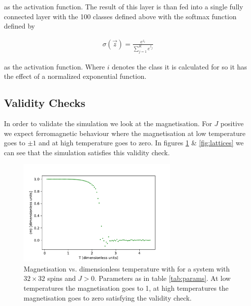 \documentclass[10 pt, a4paper]{article}
\begin{document}
as the activation function. The result of this layer is than fed into a single fully connected layer with the 100 classes defined above with the softmax function defined by

\begin{align}
\sigma(\vec{z}) = \frac{e^{z_i}}{\sum_{j=1}^K e^{z_j}}
\end{align}

as the activation function. Where $i$ denotes the class it is calculated for so it has the effect of a normalized exponential function. 

\subsection{Validity Checks}

In order to validate the simulation we look at the magnetisation. For $J$ positive we expect ferromagnetic behaviour where the magnetisation at low temperature goes to $\pm 1$ and at high temperature goes to zero. In figures \ref{fig:magval} \& \ref{fig:lattices} we can see that the simulation satisfies this validity check.

\begin{figure}[H]
\centering
\includegraphics[width=0.7\textwidth]{magval}
\caption{Magnetisation vs. dimensionless temperature with for a system with $32 \times 32$ spins and $J > 0$. Parameters as in table \ref{tab:params}. At low temperatures the magnetisation goes to 1, at high temperatures the magnetisation goes to zero satisfying the validity check. \label{fig:magval}}
\end{figure}
\end{document}
